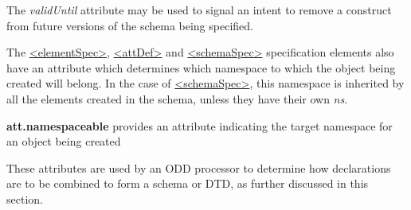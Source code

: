  The {\itshape validUntil} attribute may be used to signal an intent to remove a construct from future versions of the schema being specified.\par
The \hyperref[TEI.elementSpec]{<elementSpec>}, \hyperref[TEI.attDef]{<attDef>} and \hyperref[TEI.schemaSpec]{<schemaSpec>} specification elements also have an attribute which determines which namespace to which the object being created will belong. In the case of \hyperref[TEI.schemaSpec]{<schemaSpec>}, this namespace is inherited by all the elements created in the schema, unless they have their own {\itshape ns}. 
\begin{sansreflist}
  
\item [\textbf{att.namespaceable}] provides an attribute indicating the target namespace for an object being created
\end{sansreflist}
\par
These attributes are used by an ODD processor to determine how declarations are to be combined to form a schema or DTD, as further discussed in this section.
